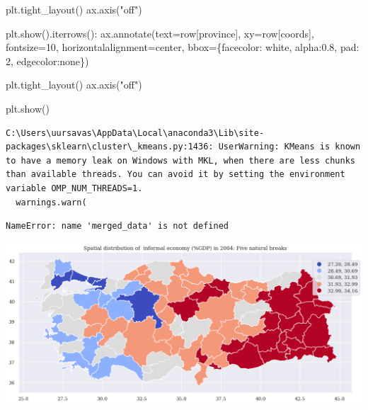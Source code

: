 \documentclass[
  letterpaper,
  DIV=11,
  numbers=noendperiod]{scrreprt}
\newenvironment{Shaded}{\begin{snugshade}}{\end{snugshade}}
\newcommand{\DecValTok}[1]{\textcolor[rgb]{0.68,0.00,0.00}{#1}}
\newcommand{\FloatTok}[1]{\textcolor[rgb]{0.68,0.00,0.00}{#1}}
\newcommand{\NormalTok}[1]{\textcolor[rgb]{0.00,0.23,0.31}{#1}}
\newcommand{\OperatorTok}[1]{\textcolor[rgb]{0.37,0.37,0.37}{#1}}
\newcommand{\StringTok}[1]{\textcolor[rgb]{0.13,0.47,0.30}{#1}}
\begin{document}
\begin{Shaded}
\begin{Highlighting}[]
\NormalTok{plt.tight\_layout()}
\NormalTok{ax.axis(}\StringTok{"off"}\NormalTok{)}

\NormalTok{plt.show().iterrows():}
\NormalTok{    ax.annotate(text}\OperatorTok{=}\NormalTok{row[}\StringTok{\textquotesingle{}province\textquotesingle{}}\NormalTok{], xy}\OperatorTok{=}\NormalTok{row[}\StringTok{\textquotesingle{}coords\textquotesingle{}}\NormalTok{], fontsize}\OperatorTok{=}\DecValTok{10}\NormalTok{,}
\NormalTok{                 horizontalalignment}\OperatorTok{=}\StringTok{\textquotesingle{}center\textquotesingle{}}\NormalTok{, bbox}\OperatorTok{=}\NormalTok{\{}\StringTok{\textquotesingle{}facecolor\textquotesingle{}}\NormalTok{: }\StringTok{\textquotesingle{}white\textquotesingle{}}\NormalTok{, }\StringTok{\textquotesingle{}alpha\textquotesingle{}}\NormalTok{:}\FloatTok{0.8}\NormalTok{, }\StringTok{\textquotesingle{}pad\textquotesingle{}}\NormalTok{: }\DecValTok{2}\NormalTok{, }\StringTok{\textquotesingle{}edgecolor\textquotesingle{}}\NormalTok{:}\StringTok{\textquotesingle{}none\textquotesingle{}}\NormalTok{\})}


\NormalTok{plt.tight\_layout()}
\NormalTok{ax.axis(}\StringTok{"off"}\NormalTok{)}

\NormalTok{plt.show()}
\end{Highlighting}
\end{Shaded}

\begin{verbatim}
C:\Users\uursavas\AppData\Local\anaconda3\Lib\site-packages\sklearn\cluster\_kmeans.py:1436: UserWarning: KMeans is known to have a memory leak on Windows with MKL, when there are less chunks than available threads. You can avoid it by setting the environment variable OMP_NUM_THREADS=1.
  warnings.warn(
\end{verbatim}

\begin{verbatim}
NameError: name 'merged_data' is not defined
\end{verbatim}

\includegraphics{labs/dani_style_informal_files/figure-pdf/cell-8-output-3.png}
\end{document}
